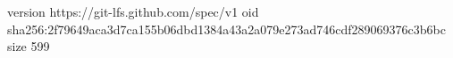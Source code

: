 version https://git-lfs.github.com/spec/v1
oid sha256:2f79649aca3d7ca155b06dbd1384a43a2a079e273ad746cdf289069376c3b6bc
size 599
